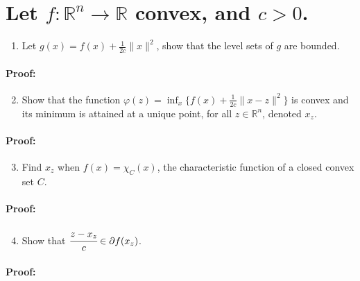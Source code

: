 \documentclass[10pt]{article}
\begin{document}
\section{Let $f: \mathbb{R}^n \rightarrow \mathbb{R}$ convex, and $c >0$.}

\begin{enumerate}[label=\alph*)]
  \item Let $g(x) = f(x) + \frac{1}{2c} \| x \|^2$, show that the level sets of $g$ are bounded.
\end{enumerate}

\paragraph{Proof:}

\blindtext

\begin{enumerate}[label=\alph*)]
  \setcounter{enumi}{1}
  \item Show that the function $\varphi(z) = \inf_{x} \{ f(x) + \frac{1}{2c} \| x- z\|^2 \}$ is convex and its minimum is attained at a unique point, for all $z \in \mathbb{R}^n$, denoted $x_z$.
\end{enumerate}

\paragraph{Proof:}

\blindtext

\begin{enumerate}[label=\alph*)]
  \setcounter{enumi}{2}
  \item Find $x_z$ when $f(x) = \chi_C(x)$, the characteristic function of a closed convex set $C$.
\end{enumerate}

\paragraph{Proof:}

\blindtext

\begin{enumerate}[label=\alph*)]
  \setcounter{enumi}{3}
  \item Show that $\cfrac{z-x_z}{c} \in \partial f(x_z)$.
\end{enumerate}

\paragraph{Proof:}
\end{document}
